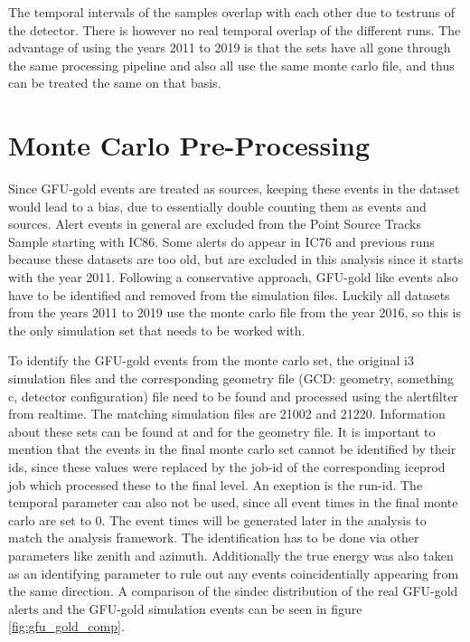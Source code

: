 The temporal intervals of the samples overlap with each other due to testruns of the detector.
There is however no real temporal overlap of the different runs. \cite{private_com}
The advantage of using the years 2011 to 2019 is that the sets have all gone through the same processing pipeline and also all use the same monte carlo file, and thus can be treated the same on that basis.

\section{Monte Carlo Pre-Processing}

Since GFU-gold events are treated as sources, keeping these events in the dataset would lead to a bias, due to essentially double counting them as events and sources.
Alert events in general are excluded from the Point Source Tracks Sample starting with IC86.
Some alerts do appear in IC76 and previous runs because these datasets are too old, but are excluded in this analysis since it starts with the year 2011.
Following a conservative approach, GFU-gold like events also have to be identified and removed from the simulation files.
Luckily all datasets from the years 2011 to 2019 use the monte carlo file from the year 2016, so this is the only simulation set that needs to be worked with.

To identify the GFU-gold events from the monte carlo set, the original i3 simulation files and the corresponding geometry file (GCD: geometry, something c, detector configuration) file need to be found and processed using the alertfilter from realtime.
The matching simulation files are 21002 and 21220.
Information about these sets can be found at \cite{sim} and \cite{gcd} for the geometry file.
It is important to mention that the events in the final monte carlo set cannot be identified by their ids, since these values were replaced by the job-id of the corresponding iceprod job which processed these to the final level. An exeption is the run-id.
The temporal parameter can also not be used, since all event times in the final monte carlo are set to \num{0}.
The event times will be generated later in the analysis to match the analysis framework.
The identification has to be done via other parameters like zenith and azimuth.
Additionally the true energy was also taken as an identifying parameter to rule out any events coincidentially appearing from the same direction.
A comparison of the sindec distribution of the real GFU-gold alerts and the GFU-gold simulation events can be seen in figure \ref{fig:gfu_gold_comp}.


